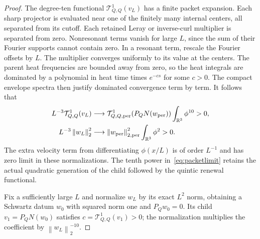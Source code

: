 \documentclass[11pt]{article}
\newcommand{\R}{\mathbb R}
\newcommand{\norm}[1]{\left\lVert#1\right\rVert}
\begin{document}
\begin{proof}
The degree-ten functional $\mathcal T_{Q,Q}^1(v_L)$ has a finite packet
expansion. Each sharp projector is evaluated near one of the finitely
many internal centers, all separated from its cutoff. Each retained
Leray or inverse-curl multiplier is separated from zero. Nonresonant
terms vanish for large $L$, since the sum of their Fourier supports
cannot contain zero. In a resonant term, rescale the Fourier offsets
by $L$. The multiplier converges uniformly to its value at the centers.
The parent heat frequencies are bounded away from zero, so the heat
integrals are dominated by a polynomial in heat time times
$e^{-cs}$ for some $c>0$. The compact envelope spectra then justify
dominated convergence term by term. It follows that
\begin{align}
 L^{-3}\mathcal T_{Q,Q}^1(v_L)
 &\longrightarrow
 \mathcal T_{Q,Q,\mathrm{per}}^1(P_QN(w_{\rm per}))
             \int_{\R^3}\phi^{10}>0,\label{eq:packetlimit}\\
 L^{-3}\norm{w_L}_2^2
 &\longrightarrow \norm{w_{\rm per}}_{2,\mathrm{per}}^2
             \int_{\R^3}\phi^2>0.\nonumber
\end{align}
The extra velocity term from differentiating $\phi(x/L)$ is of order
$L^{-1}$ and has zero limit in these normalizations. The tenth power
in~\eqref{eq:packetlimit} retains the actual quadratic generation of
the child followed by the quintic renewal functional.

Fix a sufficiently large $L$ and normalize $w_L$ by its exact $L^2$
norm, obtaining a Schwartz datum $w_0$ with squared norm one and
$P_Qw_0=0$. Its child $v_1=P_QN(w_0)$ satisfies
$c=\mathcal T_{Q,Q}^1(v_1)>0$; the normalization multiplies the
coefficient by $\norm{w_L}_2^{-10}$.


\end{proof}
\end{document}
